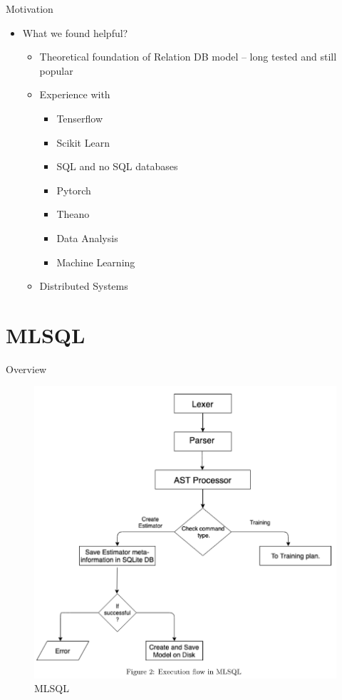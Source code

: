 \documentclass[handout, xcolor={dvipsnames}]{beamer}
\begin{document}
\begin{frame}{Motivation}{}
  \begin{itemize}
  \item<1-> {
   What we found helpful?
   \begin{itemize}
       \item<1->  Theoretical foundation of Relation DB model -- long tested and still popular
       \vspace{.2in}
       \item<2-> Experience with 
        \begin{itemize}
            
            \item<3-> Tenserflow 
            \item<4-> Scikit Learn
            \item<5-> SQL and no SQL databases
            \item<6-> Pytorch
            \item<7-> Theano
            \item<8-> Data Analysis
            \item<9-> Machine Learning
        \end{itemize}
        \vspace{.2in}
       \item<10-> Distributed Systems
   \end{itemize}
  }

  \end{itemize}
\end{frame}
\section{MLSQL}
\begin{frame}{Overview}{}
  \begin{figure}
      \centering
      \includegraphics[scale = 0.45]{flow_chart_broad.png}
      \caption{MLSQL}
      \label{fig:flow_broad}
  \end{figure}
\end{frame}
\end{document}
